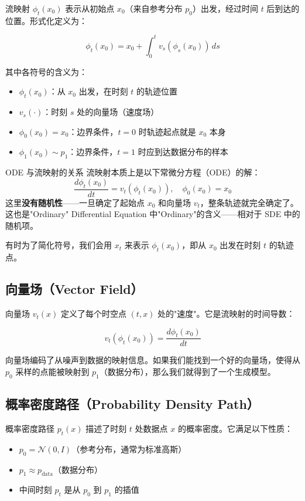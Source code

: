 \documentclass[a4paper]{article}
\begin{document}
流映射 $\phi_t(x_0)$ 表示从初始点 $x_0$（来自参考分布 $p_0$）出发，经过时间 $t$ 后到达的位置。形式化定义为：

$$\phi_t(x_0) = x_0 + \int_0^t v_s(\phi_s(x_0)) \, ds$$

其中各符号的含义为：
\begin{itemize}
    \item $\phi_t(x_0)$：从 $x_0$ 出发，在时刻 $t$ 的轨迹位置
    \item $v_s(\cdot)$：时刻 $s$ 处的向量场（速度场）
    \item $\phi_0(x_0) = x_0$：边界条件，$t=0$ 时轨迹起点就是 $x_0$ 本身
    \item $\phi_1(x_0) \sim p_1$：边界条件，$t=1$ 时应到达数据分布的样本
\end{itemize}

\begin{knowledgebox}{ODE 与流映射的关系}
流映射本质上是以下常微分方程（ODE）的解：
$$\frac{d\phi_t(x_0)}{dt} = v_t(\phi_t(x_0)), \quad \phi_0(x_0) = x_0$$
这里\textbf{没有随机性}——一旦确定了起始点 $x_0$ 和向量场 $v_t$，整条轨迹就完全确定了。这也是"Ordinary" Differential Equation 中"Ordinary"的含义——相对于 SDE 中的随机项。
\end{knowledgebox}

有时为了简化符号，我们会用 $x_t$ 来表示 $\phi_t(x_0)$，即从 $x_0$ 出发在时刻 $t$ 的轨迹点。

\subsection{向量场（Vector Field）}

向量场 $v_t(x)$ 定义了每个时空点 $(t, x)$ 处的"速度"。它是流映射的时间导数：

$$v_t(\phi_t(x_0)) = \frac{d\phi_t(x_0)}{dt}$$

向量场编码了从噪声到数据的映射信息。如果我们能找到一个好的向量场，使得从 $p_0$ 采样的点能被映射到 $p_1$（数据分布），那么我们就得到了一个生成模型。

\subsection{概率密度路径（Probability Density Path）}

概率密度路径 $p_t(x)$ 描述了时刻 $t$ 处数据点 $x$ 的概率密度。它满足以下性质：
\begin{itemize}
    \item $p_0 = \mathcal{N}(0, I)$（参考分布，通常为标准高斯）
    \item $p_1 \approx p_{\text{data}}$（数据分布）
    \item 中间时刻 $p_t$ 是从 $p_0$ 到 $p_1$ 的插值
\end{itemize}
\end{document}
